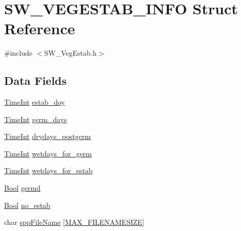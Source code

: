 \hypertarget{struct_s_w___v_e_g_e_s_t_a_b___i_n_f_o}{}\section{S\+W\+\_\+\+V\+E\+G\+E\+S\+T\+A\+B\+\_\+\+I\+N\+FO Struct Reference}
\label{struct_s_w___v_e_g_e_s_t_a_b___i_n_f_o}


{\ttfamily \#include $<$S\+W\+\_\+\+Veg\+Estab.\+h$>$}

\subsection*{Data Fields}
\begin{DoxyCompactItemize}
\item 
\hyperlink{_times_8h_a25ac787161a5cad0e3fdfe5a5aeb3236}{Time\+Int} \hyperlink{struct_s_w___v_e_g_e_s_t_a_b___i_n_f_o_a74e88b0e4800862aacd11a8673c52f82}{estab\+\_\+doy}
\item 
\hyperlink{_times_8h_a25ac787161a5cad0e3fdfe5a5aeb3236}{Time\+Int} \hyperlink{struct_s_w___v_e_g_e_s_t_a_b___i_n_f_o_ac0056e99466fe025bbcb8ea32d5712f2}{germ\+\_\+days}
\item 
\hyperlink{_times_8h_a25ac787161a5cad0e3fdfe5a5aeb3236}{Time\+Int} \hyperlink{struct_s_w___v_e_g_e_s_t_a_b___i_n_f_o_a55d3c45fb5b1cf57d46dd685c52a0470}{drydays\+\_\+postgerm}
\item 
\hyperlink{_times_8h_a25ac787161a5cad0e3fdfe5a5aeb3236}{Time\+Int} \hyperlink{struct_s_w___v_e_g_e_s_t_a_b___i_n_f_o_a6dce2c86264b4452fcf91d73cee9c5d3}{wetdays\+\_\+for\+\_\+germ}
\item 
\hyperlink{_times_8h_a25ac787161a5cad0e3fdfe5a5aeb3236}{Time\+Int} \hyperlink{struct_s_w___v_e_g_e_s_t_a_b___i_n_f_o_a054f86d5c1977a42a8bed8afb6bcc487}{wetdays\+\_\+for\+\_\+estab}
\item 
\hyperlink{generic_8h_a39db6982619d623273fad8a383489309}{Bool} \hyperlink{struct_s_w___v_e_g_e_s_t_a_b___i_n_f_o_addc1acaa3c5432e4d0ed136ab5a1f031}{germd}
\item 
\hyperlink{generic_8h_a39db6982619d623273fad8a383489309}{Bool} \hyperlink{struct_s_w___v_e_g_e_s_t_a_b___i_n_f_o_ad0b646285d2d7c3e17be68957704e184}{no\+\_\+estab}
\item 
char \hyperlink{struct_s_w___v_e_g_e_s_t_a_b___i_n_f_o_a76b1af399e02593970f6089b22f4c1ff}{spp\+File\+Name} \mbox{[}\hyperlink{_s_w___defines_8h_a4492ee6bfc6ea32e904dd50c7c733f2f}{M\+A\+X\+\_\+\+F\+I\+L\+E\+N\+A\+M\+E\+S\+I\+ZE}\mbox{]}

\end{DoxyCompactItemize}
